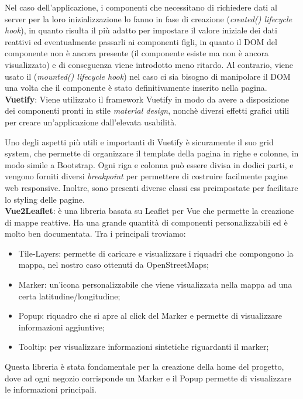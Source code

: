 \documentclass[a4paper]{report}
\begin{document}
Nel caso dell’applicazione, i componenti che necessitano di richiedere dati al server per la loro inizializzazione lo fanno in fase di creazione (\textit{created() lifecycle hook}), in quanto risulta il più adatto per impostare il valore iniziale dei dati reattivi ed eventualmente passarli ai componenti figli, in quanto il DOM del componente non è ancora presente (il componente esiste ma non è ancora visualizzato) e di conseguenza viene introdotto meno ritardo. Al contrario, viene usato il (\textit{mounted() lifecycle hook}) nel caso ci sia bisogno di manipolare il DOM una volta che il componente è stato definitivamente inserito nella pagina.\\

\textbf{Vuetify}: Viene utilizzato il framework Vuetify in modo da avere a disposizione dei componenti pronti in stile \textit{material design}, nonchè diversi effetti grafici utili per creare un’applicazione dall’elevata usabilità.

Uno degli aspetti più utili e importanti di Vuetify è sicuramente il suo grid system, che permette di organizzare il template della pagina in righe e colonne, in modo simile a Bootstrap. Ogni riga e colonna può essere divisa in dodici parti, e vengono forniti diversi \textit{breakpoint} per permettere di costruire facilmente pagine web responsive. Inoltre, sono presenti diverse classi css preimpostate per facilitare lo styling delle pagine.\\

\textbf{Vue2Leaflet}: è una libreria basata su Leaflet per Vue che permette la creazione di mappe reattive. Ha una grande quantità di componenti personalizzabili ed è molto ben documentata. Tra i principali troviamo: 

\begin{itemize}

\item Tile-Layers: permette di caricare e visualizzare i riquadri che compongono la mappa, nel nostro caso ottenuti da OpenStreetMaps;
\item  Marker: un’icona personalizzabile che viene visualizzata nella mappa ad una certa latitudine/longitudine;
\item Popup: riquadro che si apre al click del Marker e permette di visualizzare informazioni aggiuntive;
\item Tooltip: per visualizzare informazioni sintetiche riguardanti il marker;
\end{itemize}

Questa libreria è stata fondamentale per la creazione della home del progetto, dove ad ogni negozio corrisponde un Marker e il Popup permette di visualizzare le informazioni principali.\\
\end{document}
